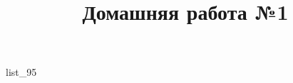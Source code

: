 \documentclass[12pt, a4paper]{article}
\begin{document}
	\title{Домашняя работа №1}
	{list_95}
\end{document}
